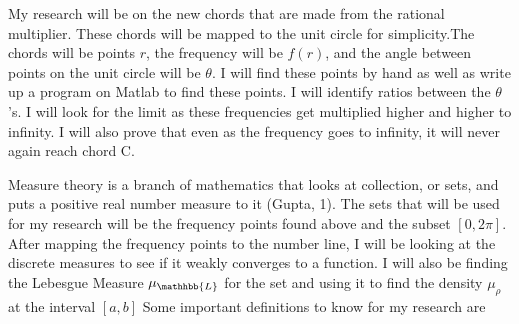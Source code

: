 \documentclass[ebook,12pt,oneside,openany]{memoir}
\begin{document}
My research will be on the new chords that are made from the rational multiplier. These chords will be mapped to the unit circle for simplicity.The chords will be points $r$, the frequency will be $f(r)$, and the angle between points on the unit circle will be $\theta$. I will find these points by hand as well as write up a program on Matlab to find these points. I will identify ratios between the $\theta$'s. I will look for the limit as these frequencies get multiplied higher and higher to infinity. I will also prove that even as the frequency goes to infinity, it will never again reach chord C. 

Measure theory is a branch of mathematics that looks at collection, or sets, and puts a positive real number measure to it (Gupta, 1). The sets that will be used for my research will be the frequency points found above and the subset $[0,2 \pi]$. After mapping the frequency points to the number line, I will be looking at the discrete measures to see if it weakly converges to a function. I will also be finding the Lebesgue Measure $\mu_{\mathhbb{L}}$ for the set and using it to find the density $\mu_{\rho}$ at the interval $[a,b]$
Some important definitions to know for my research are
\\
\end{document}
